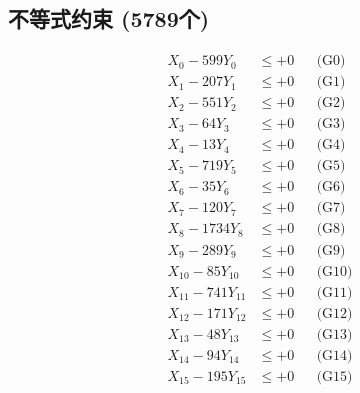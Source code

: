 \documentclass[a4paper,10pt]{article}
\begin{document}
\subsection{不等式约束 (5789个)}

\allowdisplaybreaks
{\small
\begin{align}
\allowbreak
\allowbreak
\allowbreak
\allowbreak
\allowbreak
\allowbreak
\allowbreak
\allowbreak
\allowbreak
\allowbreak
\allowbreak
\allowbreak
\allowbreak
\allowbreak
\allowbreak
\allowbreak
\allowbreak
\allowbreak
\allowbreak
\allowbreak
\allowbreak
\allowbreak
\allowbreak
\allowbreak
\allowbreak
\allowbreak
\allowbreak
\allowbreak
\allowbreak
\allowbreak
\allowbreak
\allowbreak
\allowbreak
\allowbreak
\allowbreak
\allowbreak
\allowbreak
\allowbreak
\allowbreak
\allowbreak
\allowbreak
\allowbreak
\allowbreak
\allowbreak
\allowbreak
\allowbreak
\allowbreak
\allowbreak
\allowbreak
\allowbreak
\allowbreak
\allowbreak
\allowbreak
\allowbreak
\allowbreak
\allowbreak
\allowbreak
\allowbreak
\allowbreak
\allowbreak
\allowbreak
\allowbreak
\allowbreak
\allowbreak
\allowbreak
\allowbreak
\allowbreak
\allowbreak
\allowbreak
\allowbreak
\allowbreak
\allowbreak
\allowbreak
\allowbreak
\allowbreak
\allowbreak
\allowbreak
\allowbreak
X_{0} - 599Y_{0} &\leq +0 && \text{(G0)} \\
\allowbreak
X_{1} - 207Y_{1} &\leq +0 && \text{(G1)} \\
X_{2} - 551Y_{2} &\leq +0 && \text{(G2)} \\
X_{3} - 64Y_{3} &\leq +0 && \text{(G3)} \\
X_{4} - 13Y_{4} &\leq +0 && \text{(G4)} \\
X_{5} - 719Y_{5} &\leq +0 && \text{(G5)} \\
X_{6} - 35Y_{6} &\leq +0 && \text{(G6)} \\
X_{7} - 120Y_{7} &\leq +0 && \text{(G7)} \\
X_{8} - 1734Y_{8} &\leq +0 && \text{(G8)} \\
X_{9} - 289Y_{9} &\leq +0 && \text{(G9)} \\
X_{10} - 85Y_{10} &\leq +0 && \text{(G10)} \\
\allowbreak
X_{11} - 741Y_{11} &\leq +0 && \text{(G11)} \\
X_{12} - 171Y_{12} &\leq +0 && \text{(G12)} \\
X_{13} - 48Y_{13} &\leq +0 && \text{(G13)} \\
X_{14} - 94Y_{14} &\leq +0 && \text{(G14)} \\
X_{15} - 195Y_{15} &\leq +0 && \text{(G15)} \\

\end{align}}
\end{document}
